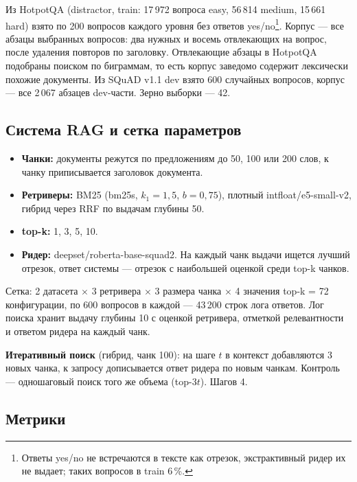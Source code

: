 Из HotpotQA (distractor, train: 17\,972 вопроса easy, 56\,814 medium, 15\,661 hard) взято по 200 вопросов каждого уровня без ответов yes/no\footnote{Ответы yes/no не встречаются в тексте как отрезок, экстрактивный ридер их не выдает; таких вопросов в train 6\,\%.}. Корпус --- все абзацы выбранных вопросов: два нужных и восемь отвлекающих на вопрос, после удаления повторов по заголовку. Отвлекающие абзацы в HotpotQA подобраны поиском по биграммам, то есть корпус заведомо содержит лексически похожие документы. Из SQuAD v1.1 dev взято 600 случайных вопросов, корпус --- все 2\,067 абзацев dev-части. Зерно выборки --- 42.

\subsection{Система RAG и сетка параметров}

\begin{itemize}
\item \textbf{Чанки:} документы режутся по предложениям до 50, 100 или 200 слов, к чанку приписывается заголовок документа.
\item \textbf{Ретриверы:} BM25 (bm25s, $k_1=1{,}5$, $b=0{,}75$), плотный intfloat/e5-small-v2, гибрид через RRF по выдачам глубины 50.
\item \textbf{top-k:} 1, 3, 5, 10.
\item \textbf{Ридер:} deepset/roberta-base-squad2. На каждый чанк выдачи ищется лучший отрезок, ответ системы --- отрезок с наибольшей оценкой среди top-k чанков.
\end{itemize}

Сетка: 2 датасета $\times$ 3 ретривера $\times$ 3 размера чанка $\times$ 4 значения top-k = 72 конфигурации, по 600 вопросов в каждой --- 43\,200 строк лога ответов. Лог поиска хранит выдачу глубины 10 с оценкой ретривера, отметкой релевантности и ответом ридера на каждый чанк.

\textbf{Итеративный поиск} (гибрид, чанк 100): на шаге $t$ в контекст добавляются 3 новых чанка, к запросу дописывается ответ ридера по новым чанкам. Контроль --- одношаговый поиск того же объема (top-$3t$). Шагов 4.

\subsection{Метрики}

